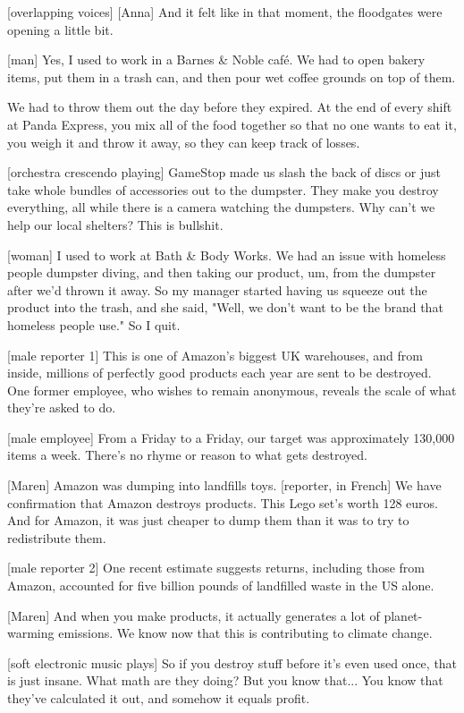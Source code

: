 \documentclass[a4paper]{article}
\begin{document}
	[overlapping voices]
	[Anna] And it felt like in that moment, the floodgates were opening a little bit.
	
	
	[man] Yes, I used to work in a Barnes \& Noble café.
	We had to open bakery items, put them in a trash can, and then pour wet coffee grounds on top of them.
	
	We had to throw them out the day before they expired.
	At the end of every shift at Panda Express, you mix all of the food together so that no one wants to eat it, you weigh it and throw it away, so they can keep track of losses.
	
	
	[orchestra crescendo playing]
	GameStop made us slash the back of discs or just take whole bundles of accessories out to the dumpster.
	They make you destroy everything, all while there is a camera watching the dumpsters.
	Why can't we help our local shelters? This is bullshit.
	
	
	[woman] I used to work at Bath \& Body Works.
	We had an issue with homeless people dumpster diving, and then taking our product, um, from the dumpster after we'd thrown it away.
	So my manager started having us squeeze out the product into the trash, and she said, "Well, we don't want to be the brand that homeless people use."
	So I quit.
	
	
	[male reporter 1] This is one of Amazon's biggest UK warehouses, and from inside, millions of perfectly good products each year are sent to be destroyed. One former employee, who wishes to remain anonymous, reveals the scale of what they're asked to do.
	
	
	[male employee] From a Friday to a Friday, our target was approximately 130,000 items a week.
	There's no rhyme or reason to what gets destroyed.
	
	
	[Maren] Amazon was dumping into landfills toys.
	[reporter, in French] We have confirmation that Amazon destroys products.
	This Lego set's worth 128 euros.
	And for Amazon, it was just cheaper to dump them than it was to try to redistribute them.
	
	
	[male reporter 2] One recent estimate suggests returns, including those from Amazon, accounted for five billion pounds of landfilled waste in the US alone.
	
	
	[Maren] And when you make products, it actually generates a lot of planet-warming emissions. We know now that this is contributing to climate change.
	
	
	[soft electronic music plays]
	So if you destroy stuff before it's even used once, that is just insane.
	What math are they doing?
	But you know that... You know that they've calculated it out, and somehow it equals profit.
	
\end{document}
